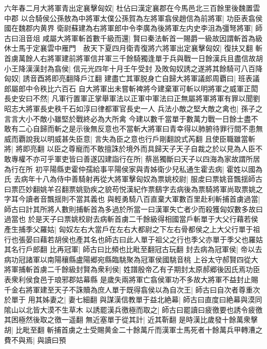 六年春二月大將軍青出定襄擊匈奴|{
	杜佔曰漢定襄郡在今馬邑北三百餘里後魏置雲中郡}
以合騎侯公孫敖為中將軍太僕公孫賀為左將軍翕侯趙信為前將軍|{
	功臣表翕侯國在魏郡内黄界}
衛尉蘇建為右將軍郎中令李廣為後將軍左内史李沮為彊弩將軍|{
	師古曰沮音俎}
咸屬大將軍斬首數千級而還|{
	賢曰秦法斬首一賜爵一級故因謂斬首為級}
休士馬于定襄雲中雁門　赦天下夏四月衛青復將六將軍出定襄擊匈奴|{
	復扶又翻}
斬首虜萬餘人右將軍建前將軍信并軍三千餘騎獨逢單于兵與戰一日餘漢兵且盡信故胡小王降漢漢封為翕侯|{
	信元光四年十月壬午受封}
及敗匈奴誘之遂將其餘騎可八百降匈奴|{
	誘音酉將即亮翻降戶江翻}
建盡亡其軍脱身亡自歸大將軍議郎周覇曰|{
	班表議郎屬郎中令秩比六百石}
自大將軍出未嘗斬裨將今建棄軍可斬以明將軍之威軍正閎長史安曰不然|{
	凡軍行置軍正掌舉軍法以正軍中軍法曰正無屬將軍將軍有罪以聞劉昭志大將軍長史秩千石如淳曰律都軍官長史一人}
兵法小敵之堅大敵之禽也|{
	孫子之言言大小不敵小雖堅於戰終必為大所禽}
今建以數千當單于數萬力戰一日餘士盡不敢有二心自歸而斬之是示後無反意也不當斬大將軍曰青幸得以肺腑待罪行間不患無威而覇說我以明威甚失臣意|{
	言失為臣之意也行戶剛翻說式芮翻}
且使臣職雖當斬將|{
	將即亮翻}
以臣之尊寵而不敢擅誅於境外而具歸天子天子自裁之於以見為人臣不敢專權不亦可乎軍吏皆曰善遂囚建詣行在所|{
	蔡邕獨斷曰天子以四海為家故謂所居為行在所}
初平陽縣吏霍仲孺給事平陽侯家與青姊衛少兒私通生霍去病|{
	霍姓以國為氏}
去病年十八為侍中善騎射再從大將軍擊匈奴為票姚校尉|{
	服䖍曰票姚音飄揺師古曰票匹妙翻姚羊召翻票姚勁疾之貌苟悦漢紀作票鷂字去病後為票騎將軍尚取票姚之字耳今讀者音飄揺則不當其義也}
與輕勇騎八百直棄大軍數百里赴利斬捕首虜過當|{
	師古曰計其所將人數則捕斬首為多過於所當一曰漢軍失亡者少而殺獲匈奴數多故曰過當也}
於是天子曰票姚校尉去病斬首虜二千餘級得相國當戶斬單于大父行藉若侯產生捕季父羅姑|{
	匈奴左右大當戶在左右大都尉之下左右骨都侯之上大父行單于祖行也張晏曰藉若胡侯也產其名也師古曰此人單于祖父之行也季父亦單于季父也羅姑其名行戶郎翻}
比再冠軍|{
	師古曰比頻也比毗至翻冠古玩翻}
封去病為冠軍侯|{
	帝以去病功冠諸軍以南陽穰縣盧陽郷宛縣臨駣聚為冠軍侯國駣音桃}
上谷太守郝賢四從大將軍捕斬首虜二千餘級封賢為衆利侯|{
	姓譜殷帝乙有子期封太原郝郷後因氏焉功臣表衆利侯食邑于琅邪郡姑幕縣}
是歲失兩將軍亡翕侯軍功不多故大將軍不益封止賜千金右將軍建至天子不誅贖為庶人單于既得翕侯以為自次王|{
	師古曰自次者尊重次於單于}
用其姊妻之|{
	妻七細翻}
與謀漢信教單于益北絶幕|{
	師古曰直度曰絶幕與漠同隂山以北皆大漠不生草木}
以誘罷漢兵徼極而取之|{
	師古曰罷讀曰疲徼要也誘令疲徼其困極然後取之徼一遥翻}
無近塞單于從其計|{
	近其靳翻}
是時漢比歲發十餘萬衆擊胡|{
	比毗至翻}
斬捕首虜之士受賜黄金二十餘萬斤而漢軍士馬死者十餘萬兵甲轉漕之費不與焉|{
	與讀曰預}
